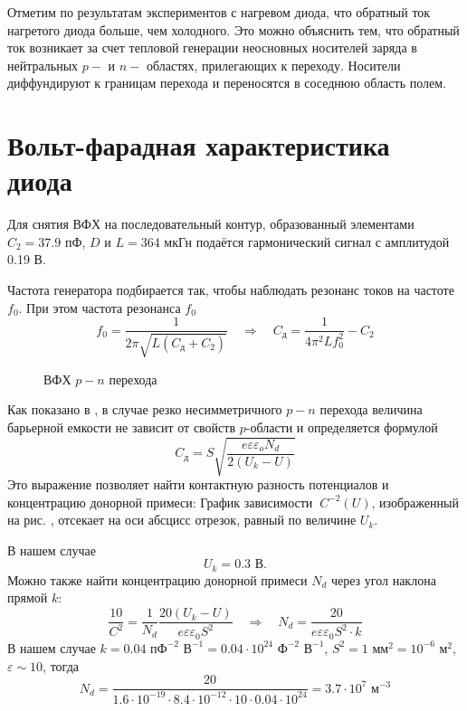 \documentclass[a4paper,14pt]{extarticle}
\begin{document}
Отметим по результатам экспериментов с нагревом диода, что обратный ток нагретого диода больше, чем холодного. Это можно объяснить тем, что обратный ток возникает за счет тепловой генерации неосновных носителей заряда в нейтральных $p-$ и $n-$ областях, прилегающих к переходу. Носители диффундируют к границам перехода и переносятся в соседнюю область полем.



\newpage
\section{Вольт-фарадная характеристика диода}

Для снятия ВФХ на последовательный контур, образованный элементами $C_2=37.9$ пФ, $D$ и $L= 364$ мкГн подаётся гармонический сигнал с амплитудой 0.19 В.

Частота генератора подбирается так, чтобы наблюдать резонанс токов на частоте $f_0$. При этом частота резонанса $f_0$
\begin{equation}
	f_0 = \frac{1}{2 \pi \sqrt{L(C_{\text{д}} + C_2)}}
	\quad\Rightarrow\quad
	C_{\text{д}} = \frac{1}{4 \pi^2 L f_0^2} - C_2
	\label{eq:cd}
\end{equation}
\begin{figure}[H]
	\centering
	\vspace{-1em}
	\caption{ВФХ $p-n$ перехода}
	\label{fig:cax}
\end{figure}

Как показано в , в случае резко несимметричного $p-n$ перехода величина барьерной емкости не зависит от свойств $p$-области и определяется формулой
\begin{equation}
	C_\text{д}=S\sqrt{\frac{e\varepsilon \varepsilon_oN_d}{2(U_k-U)}}
\end{equation}
Это выражение позволяет найти контактную разность потенциалов и концентрацию донорной примеси: График зависимости $~C^{-2}(U)$, изображенный на рис. , отсекает на оси абсцисс отрезок, равный по величине $U_k$. 

В нашем случае 
\begin{equation}
	U_k = 0.3\text{ В}.
\end{equation}
Можно также найти концентрацию донорной примеси $N_d$ через угол наклона прямой $k$:
\begin{equation}
	\frac{10}{C^2}=\frac{1}{N_d}\frac{20(U_k-U)}{e\varepsilon\varepsilon_0 S^2} \quad\Rightarrow\quad
	N_d=\frac{20}{e\varepsilon\varepsilon_0 S^2 \cdot k}
\end{equation}
В нашем случае $k=0.04 \text{ пФ}^{-2}\text{ В}^{-1}=0.04 \cdot 10^{24} \text{ Ф}^{-2}\text{ В}^{-1}$, $S^2=1\text{ мм}^2 = 10^{-6} \text{ м}^2$, $\varepsilon \sim 10$, тогда
\begin{equation}
	N_d = \frac{20}{1.6\cdot10^{-19}\cdot 8.4\cdot10^{-12}\cdot10\cdot 0.04 \cdot 10^{24}} = 3.7\cdot 10^7 \text{ м}^{-3}
\end{equation}
\end{document}
